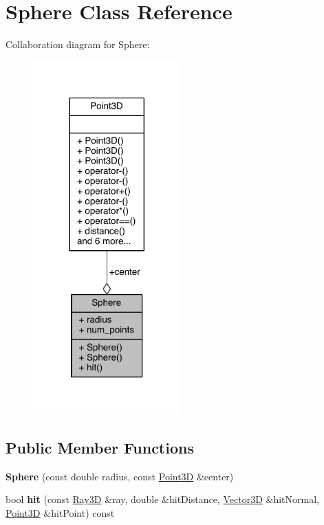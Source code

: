 \hypertarget{class_sphere}{}\section{Sphere Class Reference}
\label{class_sphere}


Collaboration diagram for Sphere\+:
\nopagebreak
\begin{figure}[H]
\begin{center}
\leavevmode
\includegraphics[width=161pt]{doxygen/latex/class_sphere__coll__graph}
\end{center}
\end{figure}
\subsection*{Public Member Functions}
\begin{DoxyCompactItemize}
\item 
\hypertarget{class_sphere_a7b5d0be5fd60ba94573e3941cf4eb094}{}\label{class_sphere_a7b5d0be5fd60ba94573e3941cf4eb094} 
{\bfseries Sphere} (const double radius, const \hyperlink{class_point3_d}{Point3D} \&center)
\item 
\hypertarget{class_sphere_a5da44ddc57c5a68a1092b0df86dc18cd}{}\label{class_sphere_a5da44ddc57c5a68a1092b0df86dc18cd} 
bool {\bfseries hit} (const \hyperlink{class_ray3_d}{Ray3D} \&ray, double \&hit\+Distance, \hyperlink{class_vector3_d}{Vector3D} \&hit\+Normal, \hyperlink{class_point3_d}{Point3D} \&hit\+Point) const
\end{DoxyCompactItemize}

